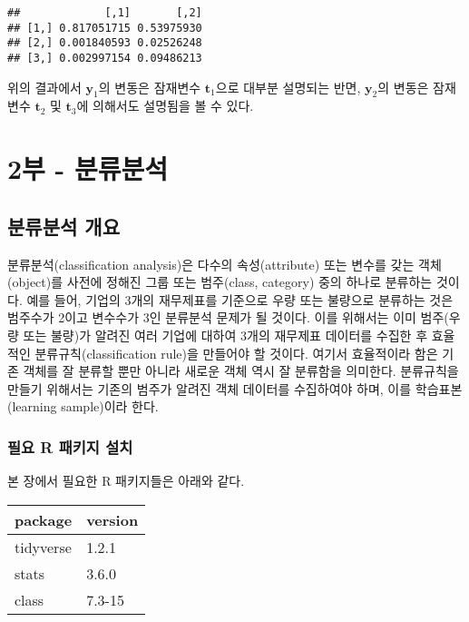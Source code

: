 \documentclass[]{book}
\begin{document}
\begin{verbatim}
##             [,1]       [,2]
## [1,] 0.817051715 0.53975930
## [2,] 0.001840593 0.02526248
## [3,] 0.002997154 0.09486213
\end{verbatim}

위의 결과에서 \(\mathbf{y}_1\)의 변동은 잠재변수 \(\mathbf{t}_1\)으로 대부분 설명되는 반면, \(\mathbf{y}_2\)의 변동은 잠재변수 \(\mathbf{t}_2\) 및 \(\mathbf{t}_3\)에 의해서도 설명됨을 볼 수 있다.

\hypertarget{part-2---}{%
\part{2부 - 분류분석}\label{part-2---}}

\hypertarget{classification-analysis}{%
\chapter{분류분석 개요}\label{classification-analysis}}

분류분석(classification analysis)은 다수의 속성(attribute) 또는 변수를 갖는 객체(object)를 사전에 정해진 그룹 또는 범주(class, category) 중의 하나로 분류하는 것이다. 예를 들어, 기업의 3개의 재무제표를 기준으로 우량 또는 불량으로 분류하는 것은 범주수가 2이고 변수수가 3인 분류분석 문제가 될 것이다. 이를 위해서는 이미 범주(우량 또는 불량)가 알려진 여러 기업에 대하여 3개의 재무제표 데이터를 수집한 후 효율적인 분류규칙(classification rule)을 만들어야 할 것이다. 여기서 효율적이라 함은 기존 객체를 잘 분류할 뿐만 아니라 새로운 객체 역시 잘 분류함을 의미한다. 분류규칙을 만들기 위해서는 기존의 범주가 알려진 객체 데이터를 수집하여야 하며, 이를 학습표본(learning sample)이라 한다.

\hypertarget{classification-packages-install}{%
\section{필요 R 패키지 설치}\label{classification-packages-install}}

본 장에서 필요한 R 패키지들은 아래와 같다.

\begin{tabular}{l|l}
\hline
package & version\\
\hline
tidyverse & 1.2.1\\
\hline
stats & 3.6.0\\
\hline
class & 7.3-15\\
\hline
\end{tabular}
\end{document}

